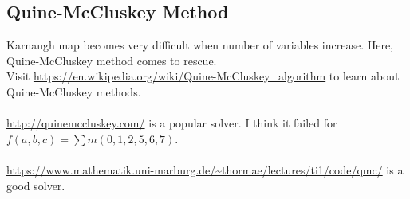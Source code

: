 \documentclass[oneside]{book}
\begin{document}
\subsection{Quine-McCluskey Method}
Karnaugh map becomes very difficult when number of variables increase. Here, Quine-McCluskey method comes to rescue.\\
Visit \url{https://en.wikipedia.org/wiki/Quine-McCluskey_algorithm} to learn about Quine-McCluskey methods. \cite{quine_mccluskey_algorithm_wiki}\\\\
\noindent\url{http://quinemccluskey.com/} is a popular solver. I think it failed for \(f(a,b,c) = \sum m(0,1,2,5,6,7)\).\\\\
\noindent\url{https://www.mathematik.uni-marburg.de/~thormae/lectures/ti1/code/qmc/} is a good solver.
\end{document}
